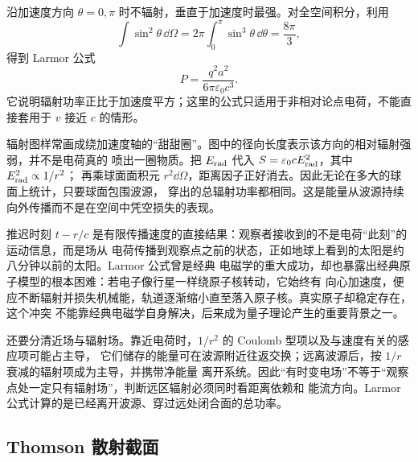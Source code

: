 \radiationPatternDiagram

沿加速度方向 $\theta=0,\pi$ 时不辐射，垂直于加速度时最强。对全空间积分，利用
\begin{equation}
  \int\sin^2\theta\,\dd\Omega
  =2\pi\int_0^\pi\sin^3\theta\,\dd\theta=\frac{8\pi}{3},
\end{equation}
得到 Larmor 公式
\begin{equation}
  \boxed{P=\frac{q^2a^2}{6\pi\varepsilon_0c^3}}.
\end{equation}
它说明辐射功率正比于加速度平方；这里的公式只适用于非相对论点电荷，不能直接套用于
$v$ 接近 $c$ 的情形。

辐射图样常画成绕加速度轴的“甜甜圈”。图中的径向长度表示该方向的相对辐射强弱，并不是电荷真的
喷出一圈物质。把 $E_{\rm rad}$ 代入 $S=\varepsilon_0cE_{\rm rad}^2$，其中 $E_{\rm rad}^2\propto1/r^2$；
再乘球面面积元 $r^2\dd\Omega$，距离因子正好消去。因此无论在多大的球面上统计，只要球面包围波源，
穿出的总辐射功率都相同。这是能量从波源持续向外传播而不是在空间中凭空损失的表现。

推迟时刻 $t-r/c$ 是有限传播速度的直接结果：观察者接收到的不是电荷“此刻”的运动信息，而是场从
电荷传播到观察点之前的状态，正如地球上看到的太阳是约八分钟以前的太阳。Larmor 公式曾是经典
电磁学的重大成功，却也暴露出经典原子模型的根本困难：若电子像行星一样绕原子核转动，它始终有
向心加速度，便应不断辐射并损失机械能，轨道逐渐缩小直至落入原子核。真实原子却稳定存在，这个冲突
不能靠经典电磁学自身解决，后来成为量子理论产生的重要背景之一。

还要分清近场与辐射场。靠近电荷时，$1/r^2$ 的 Coulomb 型项以及与速度有关的感应项可能占主导，
它们储存的能量可在波源附近往返交换；远离波源后，按 $1/r$ 衰减的辐射项成为主导，并携带净能量
离开系统。因此“有时变电场”不等于“观察点处一定只有辐射场”，判断远区辐射必须同时看距离依赖和
能流方向。Larmor 公式计算的是已经离开波源、穿过远处闭合面的总功率。

\subsection*{Thomson 散射截面}

